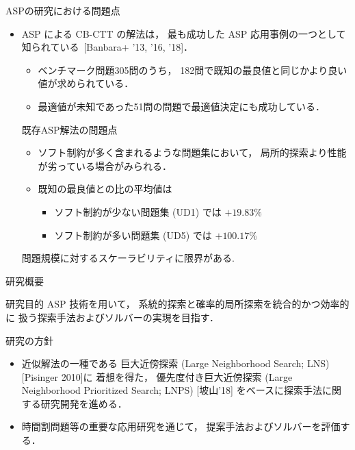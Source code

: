 \documentclass[11pt,dvipdfmx,handout]{beamer}
\begin{document}
\begin{frame}{ASPの研究における問題点}
  \begin{itemize}
  \item ASP による CB-CTT の解法は，
    最も成功した ASP 応用事例の一つとして知られている~[Banbara+ '13, '16, '18]．
    \begin{itemize}
    \item ベンチマーク問題305問のうち，
      182問で既知の最良値と同じかより良い値が求められている．
  \item %
  最適値が未知であった51問の問題で最適値決定にも成功している．
     \end{itemize}
  \begin{alertblock}{既存ASP解法の問題点}
    \begin{itemize}
    \item %
    ソフト制約が多く含まれるような問題集において，
      局所的探索より性能が劣っている場合がみられる．
     \item 既知の最良値との比の平均値は
       \begin{itemize}
       \item ソフト制約が少ない問題集 (UD1) では $+19.83\%$
       \item ソフト制約が多い問題集 (UD5) では $+100.17\%$
       \end{itemize}
    \end{itemize}
  \end{alertblock}
  \begin{block}{}\centering
   問題規模に対するスケーラビリティに限界がある.
  \end{block}
  \end{itemize}
\end{frame}
\begin{frame}{研究概要}
 \begin{alertblock}{研究目的}
    ASP 技術を用いて，
   系統的探索と確率的局所探索を統合的かつ効率的に
   扱う探索手法およびソルバーの実現を目指す．
 \end{alertblock}

 \begin{exampleblock}{研究の方針}
  \begin{itemize}
  \item 近似解法の一種である
  \alert{巨大近傍探索} (Large Neighborhood Search; LNS) [Pisinger 2010]に
  着想を得た，
  \alert{優先度付き巨大近傍探索} (Large Neighborhood Prioritized Search; LNPS) [坡山'18]
  をベースに探索手法に関する研究開発を進める．
  \item 時間割問題等の重要な応用研究を通じて，
  提案手法およびソルバーを評価する．
  \end{itemize}
 \end{exampleblock}
\end{frame}
\end{document}
